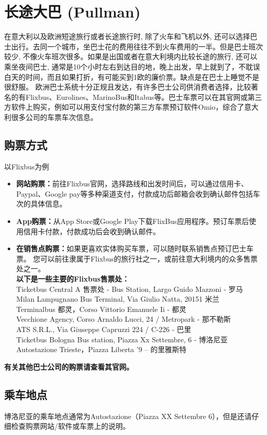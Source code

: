 \section{长途大巴 (Pullman)}
在意大利以及欧洲短途旅行或者长途旅行时, 除了火车和飞机以外, 还可以选择巴士出行。去同一个城市，坐巴士花的费用往往不到火车费用的一半。但是巴士班次较少, 不像火车班次很多。如果是出国或者在意大利境内比较长途的旅行, 还可以乘坐夜间巴士, 通常是10个小时左右到达目的地，晚上出发，早上就到了，不耽误白天的时间，而且如果打折，有可能买到1欧的廉价票。缺点是在巴士上睡觉不是很舒服。
欧洲巴士系统十分正规且发达，有许多巴士公司供消费者选择，比较著名的有Flixbus、Eurolines、MarinoBus和Itabus等。巴士车票可以在其官网或第三方软件上购买，例如可以用支付宝付款的第三方车票预订软件Omio，综合了意大利很多公司的车票车次信息。
\subsection{购票方式}
以Flixbus为例
\begin{itemize}
\item  \textbf{网站购票：}前往Flixbus官网，选择路线和出发时间后，可以通过信用卡、Paypal、Google pay等多种渠道支付，付款成功后邮箱会收到确认邮件包括车次的具体信息。
\item  \textbf{App购票：}从App Store或Google Play下载FlixBus应用程序。预订车票后使用信用卡付款，付款成功后会收到确认邮件。
\item  \textbf{在销售点购票：}如果更喜欢实体购买车票，可以随时联系销售点预订巴士车票。 您可以前往隶属于Flixbus的旅行社之一，或前往意大利境内的众多售票处之一。\\
\textbf{以下是一些主要的Flixbus售票处：}\\
Ticketbus Central A 售票处 - Bus Station, Largo Guido Mazzoni - 罗马\\
Milan Lampugnano Bus Terminal, Via Giulio Natta, 20151 米兰\\
Terminalbus 都灵，Corso Vittorio Emanuele Ii - 都灵\\
Vecchione Agency, Corso Arnaldo Lucci, 24 / Metropark - 那不勒斯\\
ATS S.R.L., Via Giuseppe Capruzzi 224 / C-226 - 巴里\\
Ticketbus Bologna Bus station, Piazza Xx Settembre, 6 - 博洛尼亚\\
Autostazione Trieste，Piazza Liberta '9 – 的里雅斯特\\
\end{itemize}
\textbf{有关其他巴士公司的购票请查看其官网。}\\
\subsection{乘车地点}
博洛尼亚的乘车地点通常为Autostazione（Piazza XX Settembre 6），但是还请仔细检查购票网站/软件或车票上的说明。

